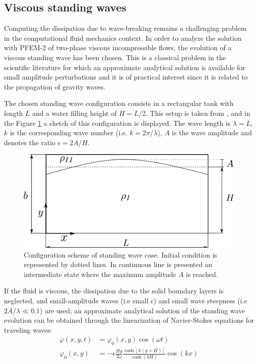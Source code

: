 \subsection{Viscous standing waves}%

Computing the dissipation due to wave-breaking remains a challenging problem in the computational fluid mechanics context. In order to analyze the solution with PFEM-2 of two-phase viscous incompressible flows, the evolution of a viscous standing wave has been chosen. This is a classical problem in the scientific literature for which an approximate analytical solution is available for small amplitude perturbations\cite{Lighthill01} and it is of practical interest since it is related to the propagation of gravity waves.

The chosen standing wave configuration consists in a rectangular tank with length $L$ and a water filling height of $H = L/2$. This setup is taken from \cite{Colagrossi12}, and in the Figure \ref{fg:standing-wave-config} a sketch of this configuration is displayed. The wave length is $\lambda = L$, $k$ is the corresponding wave number (i.e. $k = 2\pi/\lambda$), $A$ is the wave amplitude and denotes the ratio $\epsilon=2A/H$.

\begin{figure}[H]
  \begin{center}
      \includegraphics[width=.7\columnwidth]{images/standing_wave.pdf}
  \end{center}
  \caption{\label{fg:standing-wave-config} Configuration scheme of standing wave case. Initial condition is represented by dotted lines. In continuous line is presented an intermediate state where the maximum amplitude $A$ is reached.}
\end{figure}

If the fluid is viscous, the dissipation due to the solid boundary layers is neglected, and small-amplitude waves (i.e small $\epsilon$) and small wave steepness (i.e $2A/\lambda \ll 0.1$) are used; an approximate analytical solution of the standing wave evolution can be obtained through the linearization of Navier-Stokes equations for traveling waves:
\begin{align}
 \varphi(x,y,t) & = \varphi_0(x,y)\cos(\omega t) \\
 \varphi_0(x,y) & =-\epsilon\frac{Hg}{2\omega}\frac{\cosh\left[k(y+H)\right]}{\cosh(kH)}\cos(kx)
\end{align}


